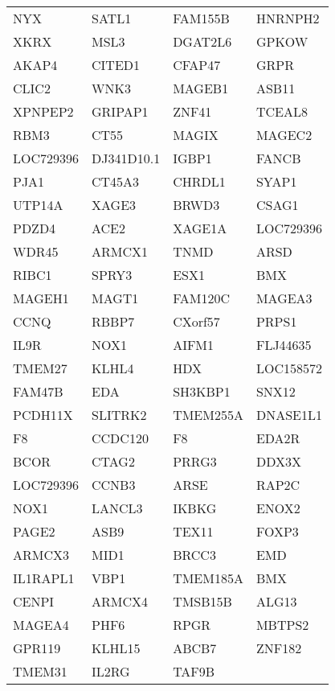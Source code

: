 {\begin{longtable}{llll}
NYX&SATL1&FAM155B&HNRNPH2\tabularnewline
XKRX&MSL3&DGAT2L6&GPKOW\tabularnewline
AKAP4&CITED1&CFAP47&GRPR\tabularnewline
CLIC2&WNK3&MAGEB1&ASB11\tabularnewline
XPNPEP2&GRIPAP1&ZNF41&TCEAL8\tabularnewline
RBM3&CT55&MAGIX&MAGEC2\tabularnewline
LOC729396&DJ341D10.1&IGBP1&FANCB\tabularnewline
PJA1&CT45A3&CHRDL1&SYAP1\tabularnewline
UTP14A&XAGE3&BRWD3&CSAG1\tabularnewline
PDZD4&ACE2&XAGE1A&LOC729396\tabularnewline
WDR45&ARMCX1&TNMD&ARSD\tabularnewline
RIBC1&SPRY3&ESX1&BMX\tabularnewline
MAGEH1&MAGT1&FAM120C&MAGEA3\tabularnewline
CCNQ&RBBP7&CXorf57&PRPS1\tabularnewline
IL9R&NOX1&AIFM1&FLJ44635\tabularnewline
TMEM27&KLHL4&HDX&LOC158572\tabularnewline
FAM47B&EDA&SH3KBP1&SNX12\tabularnewline
PCDH11X&SLITRK2&TMEM255A&DNASE1L1\tabularnewline
\newpage
F8&CCDC120&F8&EDA2R\tabularnewline
BCOR&CTAG2&PRRG3&DDX3X\tabularnewline
LOC729396&CCNB3&ARSE&RAP2C\tabularnewline
NOX1&LANCL3&IKBKG&ENOX2\tabularnewline
PAGE2&ASB9&TEX11&FOXP3\tabularnewline
ARMCX3&MID1&BRCC3&EMD\tabularnewline
IL1RAPL1&VBP1&TMEM185A&BMX\tabularnewline
CENPI&ARMCX4&TMSB15B&ALG13\tabularnewline
MAGEA4&PHF6&RPGR&MBTPS2\tabularnewline
GPR119&KLHL15&ABCB7&ZNF182\tabularnewline
TMEM31&IL2RG&TAF9B&\tabularnewline
\bottomrule
\end{longtable}}
\addtocounter{table}{-1}
